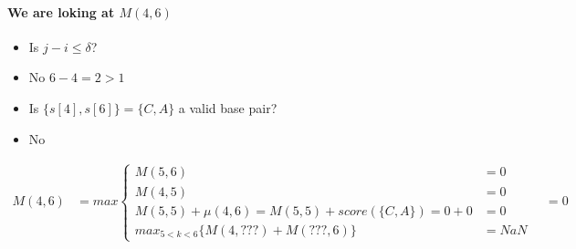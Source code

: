 \paragraph{We are loking at $M(4,6)$}
\begin{itemize}
    \item[] Is $j-i \leq \delta$?
    \item[$\rightarrow$]  No $6-4 = 2 > 1$
    \item[] Is $\{s[4], s[6]\} = \{C, A\}$ a valid base pair?
    \item[$\rightarrow$]  No
\end{itemize}

\begin{align*}
    M(4,6) & = max \begin{cases}
                       M(5,6) & = 0 \\ %
                       M(4,5) & = 0 \\ %
                       M(5,5) + \mu(4,6) = M(5,5) + score(\{C, A\}) = 0 + 0 & = 0 \\ %
                       max_{5 < k < 6} \{ M(4, ???) + M( ???, 6) \} & = NaN
    \end{cases} \quad =  0
\end{align*}



